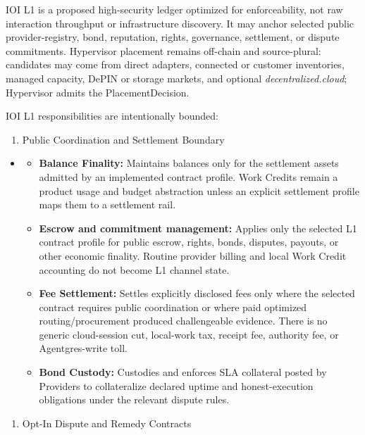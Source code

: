 \documentclass[
  11pt,
]{article}
\providecommand{\tightlist}{%
  \setlength{\itemsep}{0pt}\setlength{\parskip}{0pt}}
\begin{document}
IOI L1 is a proposed high-security ledger optimized for enforceability,
not raw interaction throughput or infrastructure discovery. It may anchor
selected public provider-registry, bond, reputation, rights, governance,
settlement, or dispute commitments. Hypervisor placement remains off-chain
and source-plural: candidates may come from direct adapters, connected or
customer inventories, managed capacity, DePIN or storage markets, and
optional \emph{decentralized.cloud}; Hypervisor admits the
PlacementDecision.

IOI L1 responsibilities are intentionally bounded:

\begin{enumerate}
\def\labelenumi{\arabic{enumi}.}
\tightlist
\item
  Public Coordination and Settlement Boundary
\end{enumerate}

\begin{itemize}
\item
  \begin{itemize}
  \tightlist
  \item
    \textbf{Balance Finality:} Maintains balances only for the settlement
    assets admitted by an implemented contract profile. Work Credits remain
    a product usage and budget abstraction unless an explicit settlement
    profile maps them to a settlement rail.
  \item
    \textbf{Escrow and commitment management:} Applies only the selected L1
    contract profile for public escrow, rights, bonds, disputes, payouts, or
    other economic finality. Routine provider billing and local Work Credit
    accounting do not become L1 channel state.
  \item
    \textbf{Fee Settlement:} Settles explicitly disclosed fees only where
    the selected contract requires public coordination or where paid
    optimized routing/procurement produced challengeable evidence. There is
    no generic cloud-session cut, local-work tax, receipt fee, authority fee,
    or Agentgres-write toll.
  \item
    \textbf{Bond Custody:} Custodies and enforces SLA collateral posted
    by Providers to collateralize declared uptime and honest-execution
    obligations under the relevant dispute rules.
  \end{itemize}
\end{itemize}

\begin{enumerate}
\def\labelenumi{\arabic{enumi}.}
\tightlist
\item
  Opt-In Dispute and Remedy Contracts
\end{enumerate}
\end{document}
